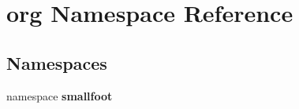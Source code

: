 \section{org \-Namespace \-Reference}
\label{namespaceorg}
\subsection*{\-Namespaces}
\begin{DoxyCompactItemize}
\item 
namespace {\bf smallfoot}
\end{DoxyCompactItemize}
